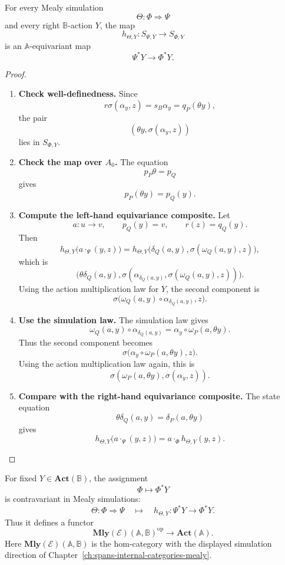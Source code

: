 \begin{theorem}
\label{thm:relative-simulations-evaluate-equivariantly}
For every Mealy simulation
\[
\Theta:\Phi\Rightarrow\Psi
\]
and every right \(\mathbb B\)-action \(Y\), the map
\[
h_{\Theta,Y}:S_{\Psi,Y}\to S_{\Phi,Y}
\]
is an \(\mathbb A\)-equivariant map
\[
\Psi^\ast Y\to \Phi^\ast Y.
\]
\end{theorem}

\begin{proof}
\leavevmode
\begin{enumerate}
\item \textbf{Check well-definedness.}
Since
\[
r\sigma(\alpha_y,z)=s_B\alpha_y=q_P(\theta y),
\]
the pair
\[
(\theta y,\sigma(\alpha_y,z))
\]
lies in \(S_{\Phi,Y}\).

\item \textbf{Check the map over \(A_0\).}
The equation
\[
p_P\theta=p_Q
\]
gives
\[
p_P(\theta y)=p_Q(y).
\]

\item \textbf{Compute the left-hand equivariance composite.}
Let
\[
a:u\to v,
\qquad
p_Q(y)=v,
\qquad
r(z)=q_Q(y).
\]
Then
\[
h_{\Theta,Y}\bigl(a\cdot_\Psi(y,z)\bigr)
=
h_{\Theta,Y}
\bigl(
\delta_Q(a,y),
\sigma(\omega_Q(a,y),z)
\bigr),
\]
which is
\[
\bigl(
\theta\delta_Q(a,y),
\sigma(\alpha_{\delta_Q(a,y)},\sigma(\omega_Q(a,y),z))
\bigr).
\]
Using the action multiplication law for \(Y\), the second component is
\[
\sigma\bigl(
\omega_Q(a,y)\circ \alpha_{\delta_Q(a,y)},
z
\bigr).
\]

\item \textbf{Use the simulation law.}
The simulation law gives
\[
\omega_Q(a,y)\circ \alpha_{\delta_Q(a,y)}
=
\alpha_y\circ \omega_P(a,\theta y).
\]
Thus the second component becomes
\[
\sigma\bigl(
\alpha_y\circ \omega_P(a,\theta y),
z
\bigr).
\]
Using the action multiplication law again, this is
\[
\sigma(\omega_P(a,\theta y),\sigma(\alpha_y,z)).
\]

\item \textbf{Compare with the right-hand equivariance composite.}
The state equation
\[
\theta\delta_Q(a,y)=\delta_P(a,\theta y)
\]
gives
\[
h_{\Theta,Y}\bigl(a\cdot_\Psi(y,z)\bigr)
=
a\cdot_\Phi h_{\Theta,Y}(y,z).
\]
\end{enumerate}
\end{proof}

\begin{corollary}
\label{cor:relative-contravariance-actions}
For fixed \(Y\in\mathbf{Act}(\mathbb B)\), the assignment
\[
\Phi\longmapsto\Phi^\ast Y
\]
is contravariant in Mealy simulations:
\[
\Theta:\Phi\Rightarrow\Psi
\quad\longmapsto\quad
h_{\Theta,Y}:\Psi^\ast Y\to\Phi^\ast Y.
\]
Thus it defines a functor
\[
\mathbf{Mly}(\mathcal E)(\mathbb A,\mathbb B)^{\mathrm{op}}
\longrightarrow
\mathbf{Act}(\mathbb A).
\]
Here \(\mathbf{Mly}(\mathcal E)(\mathbb A,\mathbb B)\) is the hom-category
with the displayed simulation direction of
Chapter~\ref{ch:spans-internal-categories-mealy}.
\end{corollary}


